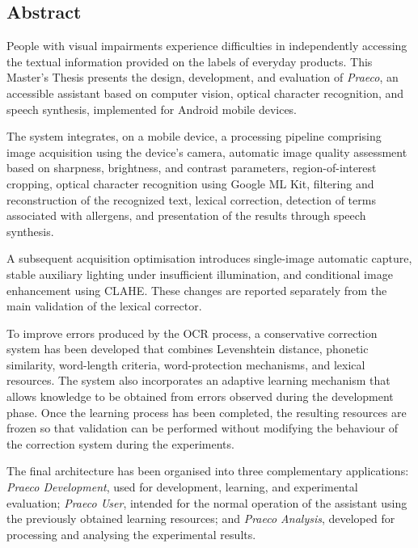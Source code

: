 
%
\noindent \begin{center}
\section*{Abstract}
\par\end{center}

People with visual impairments experience difficulties in independently accessing the textual information provided on the labels of everyday products. This Master's Thesis presents the design, development, and evaluation of \textit{Praeco}, an accessible assistant based on computer vision, optical character recognition, and speech synthesis, implemented for Android mobile devices.

The system integrates, on a mobile device, a processing pipeline comprising image acquisition using the device's camera, automatic image quality assessment based on sharpness, brightness, and contrast parameters, region-of-interest cropping, optical character recognition using Google ML Kit, filtering and reconstruction of the recognized text, lexical correction, detection of terms associated with allergens, and presentation of the results through speech synthesis.

A subsequent acquisition optimisation introduces single-image automatic capture, stable auxiliary lighting under insufficient illumination, and conditional image enhancement using CLAHE. These changes are reported separately from the main validation of the lexical corrector.

To improve errors produced by the OCR process, a conservative correction system has been developed that combines Levenshtein distance, phonetic similarity, word-length criteria, word-protection mechanisms, and lexical resources. The system also incorporates an adaptive learning mechanism that allows knowledge to be obtained from errors observed during the development phase. Once the learning process has been completed, the resulting resources are frozen so that validation can be performed without modifying the behaviour of the correction system during the experiments.

The final architecture has been organised into three complementary applications: \textit{Praeco Development}, used for development, learning, and experimental evaluation; \textit{Praeco User}, intended for the normal operation of the assistant using the previously obtained learning resources; and \textit{Praeco Analysis}, developed for processing and analysing the experimental results.

